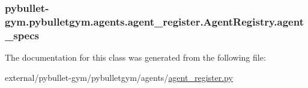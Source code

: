 \subsubsection[{\texorpdfstring{agent\+\_\+specs}{agent_specs}}]{\setlength{\rightskip}{0pt plus 5cm}pybullet-\/gym.\+pybulletgym.\+agents.\+agent\+\_\+register.\+Agent\+Registry.\+agent\+\_\+specs}\hypertarget{classpybullet-gym_1_1pybulletgym_1_1agents_1_1agent__register_1_1_agent_registry_a095c0478b6632f3fa6600fa12a1e7487}{}\label{classpybullet-gym_1_1pybulletgym_1_1agents_1_1agent__register_1_1_agent_registry_a095c0478b6632f3fa6600fa12a1e7487}


The documentation for this class was generated from the following file\+:\begin{DoxyCompactItemize}
\item 
external/pybullet-\/gym/pybulletgym/agents/\hyperlink{agent__register_8py}{agent\+\_\+register.\+py}\end{DoxyCompactItemize}
